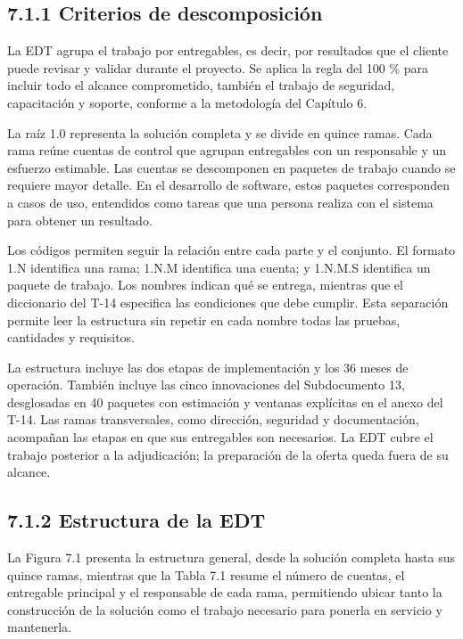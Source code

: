 \documentclass[11pt]{article}
\begin{document}
\subsection{7.1.1 Criterios de descomposición}

La EDT agrupa el trabajo por entregables, es decir, por resultados que el cliente puede revisar y validar durante el proyecto. Se aplica la regla del 100 \% para incluir todo el alcance comprometido, también el trabajo de seguridad, capacitación y soporte, conforme a la metodología del Capítulo 6.

La raíz 1.0 representa la solución completa y se divide en quince ramas. Cada rama reúne cuentas de control que agrupan entregables con un responsable y un esfuerzo estimable. Las cuentas se descomponen en paquetes de trabajo cuando se requiere mayor detalle. En el desarrollo de software, estos paquetes corresponden a casos de uso, entendidos como tareas que una persona realiza con el sistema para obtener un resultado.

Los códigos permiten seguir la relación entre cada parte y el conjunto. El formato 1.N identifica una rama; 1.N.M identifica una cuenta; y 1.N.M.S identifica un paquete de trabajo. Los nombres indican qué se entrega, mientras que el diccionario del T-14 especifica las condiciones que debe cumplir. Esta separación permite leer la estructura sin repetir en cada nombre todas las pruebas, cantidades y requisitos.

La estructura incluye las dos etapas de implementación y los 36 meses de operación. También incluye las cinco innovaciones del Subdocumento 13, desglosadas en 40 paquetes con estimación y ventanas explícitas en el anexo del T-14. Las ramas transversales, como dirección, seguridad y documentación, acompañan las etapas en que sus entregables son necesarios. La EDT cubre el trabajo posterior a la adjudicación; la preparación de la oferta queda fuera de su alcance.

\subsection{7.1.2 Estructura de la EDT}

La Figura 7.1 presenta la estructura general, desde la solución completa hasta sus quince ramas, mientras que la Tabla 7.1 resume el número de cuentas, el entregable principal y el responsable de cada rama, permitiendo ubicar tanto la construcción de la solución como el trabajo necesario para ponerla en servicio y mantenerla.
\end{document}
